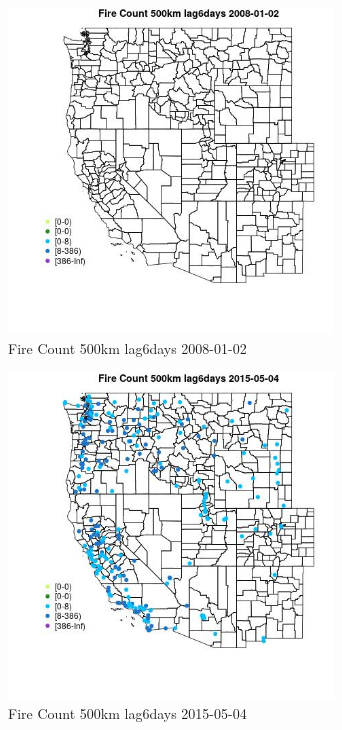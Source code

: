 \begin{figure} 
\centering  
\includegraphics[width=0.77\textwidth]{Code_Outputs/Report_ML_input_PM25_Step4_part_e_de_duplicated_aves_compiled_2019-05-18wNAs_MapObsFire_Count_500km_lag6days2008-01-02.jpg} 
\caption{\label{fig:Report_ML_input_PM25_Step4_part_e_de_duplicated_aves_compiled_2019-05-18wNAsMapObsFire_Count_500km_lag6days2008-01-02}Fire Count 500km lag6days 2008-01-02} 
\end{figure} 
 

\begin{figure} 
\centering  
\includegraphics[width=0.77\textwidth]{Code_Outputs/Report_ML_input_PM25_Step4_part_e_de_duplicated_aves_compiled_2019-05-18wNAs_MapObsFire_Count_500km_lag6days2015-05-04.jpg} 
\caption{\label{fig:Report_ML_input_PM25_Step4_part_e_de_duplicated_aves_compiled_2019-05-18wNAsMapObsFire_Count_500km_lag6days2015-05-04}Fire Count 500km lag6days 2015-05-04} 
\end{figure} 
 

